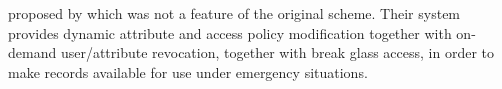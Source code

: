 proposed by \cite{Yu2010a} which was not a feature of the original scheme. Their system provides dynamic attribute and access policy modification together with on-demand user/attribute revocation, together with break glass access, in order to make records available for use under emergency situations.

%
%	
%	
%	
%	
%	
